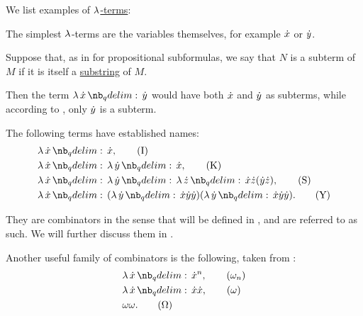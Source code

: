 \begin{example}\label{ex:def:lambda_term}
  We list examples of \hyperref[def:lambda_term]{\( \mathrm{\lambda} \)-terms}:
  \begin{thmenum}
     The simplest \( \mathrm{\lambda} \)-terms are the variables themselves, for example \( {\dot{x}} \) or \( {\dot{y}} \).

     Suppose that, as in  for propositional subformulas, we say that \( N \) is a subterm of \( M \) if it is itself a \hyperref[def:formal_language/substring]{substring} of \( M \).

    Then the term \( \qabs \synx \syny \) would have both \( {\dot{x}} \) and \( {\dot{y}} \) as subterms, while according to , only \( {\dot{y}} \) is a subterm.

     The following terms have established names:
    \begin{align}
      &\qabs \synx \synx, \label{eq:ex:def:lambda_term/combinator/i}\tag{I} \\
      &\qabs \synx \qabs \syny \synx, \label{eq:ex:def:lambda_term/combinator/k}\tag{K} \\
      &\qabs \synx \qabs \syny \qabs \synz \synx \synz (\syny \synz), \label{eq:ex:def:lambda_term/combinator/s}\tag{S} \\
      &\qabs \synx (\qabs \syny \synx \syny \syny) (\qabs \syny \synx \syny \syny). \label{eq:ex:def:lambda_term/combinator/y}\tag{Y} \\
    \end{align}

    They are combinators in the sense that will be defined in , and are referred to as such. We will further discuss them in .

    Another useful family of combinators is the following, taken from \cite[3.1.21; 6.2.1]{Barendregt1984LambdaCalculus}:
    \begin{align}
      &\qabs \synx \synx^n, \label{eq:ex:def:lambda_term/combinator/omega_n}\tag{\ensuremath{ \omega_n }} \\
      &\qabs \synx \synx \synx, \label{eq:ex:def:lambda_term/combinator/omega}\tag{\ensuremath{ \omega }} \\
      &\omega \omega. \label{eq:ex:def:lambda_term/combinator/big_omega}\tag{\ensuremath{ \Omega }}
    \end{align}
  \end{thmenum}
\end{example}

